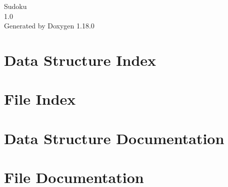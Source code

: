 \documentclass[twoside]{book}
\newcommand{\+}{\discretionary{\mbox{\scriptsize$\hookleftarrow$}}{}{}}
\newcommand{\clearemptydoublepage}{%
    \newpage{\pagestyle{empty}\cleardoublepage}%
  }
\begin{document}
  \raggedbottom
    \hypersetup{pageanchor=false,
                bookmarksnumbered=true,
                pdfencoding=unicode
               }
  \begin{titlepage}
  \vspace*{7cm}
  \begin{center}%
  {\Large Sudoku}\\
  [1ex]\large 1.\+0 \\
  \vspace*{1cm}
  {\large Generated by Doxygen 1.18.0}\\
  \end{center}
  \end{titlepage}
  \clearemptydoublepage
  \tableofcontents
  \clearemptydoublepage
  \hypersetup{pageanchor=true}
\chapter{Data Structure Index}

\chapter{File Index}

\chapter{Data Structure Documentation}

\chapter{File Documentation}










  \backmatter
  \newpage
  \clearemptydoublepage
  \printindex
\end{document}
